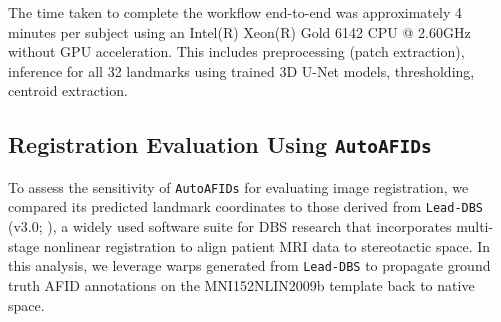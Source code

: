 The time taken to complete the workflow end-to-end was approximately 4 minutes per subject using an Intel(R) Xeon(R) Gold 6142 CPU @ 2.60GHz without GPU acceleration. This includes preprocessing (patch extraction), inference for all 32 landmarks using trained 3D U-Net models, thresholding, centroid extraction.


\subsection{Registration Evaluation Using \texttt{AutoAFIDs}}
To assess the sensitivity of \texttt{AutoAFIDs} for evaluating image registration, we compared its predicted landmark coordinates to those derived from \texttt{Lead-DBS} (v3.0; \cite{Neudorfer2023-wd}), a widely used software suite for DBS research that incorporates multi-stage nonlinear registration to align patient MRI data to stereotactic space. In this analysis, we leverage warps generated from \texttt{Lead-DBS} to propagate ground truth AFID annotations on the MNI152NLIN2009b template back to native space.


